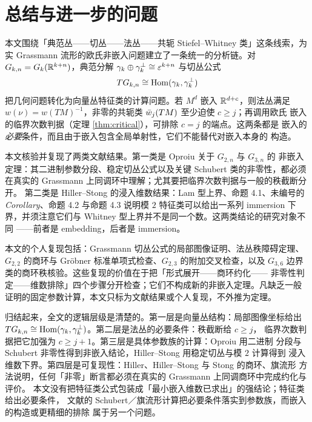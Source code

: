 \section{总结与进一步的问题}

本文围绕「典范丛——切丛——法丛——共轭 Stiefel--Whitney 类」这条线索，为实
Grassmann 流形的欧氏非嵌入问题建立了一条统一的分析链。对
$G_{k,n}=G_k(\mathbb{R}^{k+n})$，典范分解 $\gamma_k\oplus\gamma^{\perp}_k\cong\varepsilon^{k+n}$ 与切丛公式
\begin{equation*}
  TG_{k,n}\cong\operatorname{Hom}(\gamma_k,\gamma^{\perp}_k)
\end{equation*}
把几何问题转化为向量丛特征类的计算问题。若 $M^{d}$ 嵌入 $\mathbb{R}^{d+c}$，则法丛满足
$w(\nu)=w(TM)^{-1}$，非零的共轭类 $\bar w_j(TM)$ 至少迫使 $c\ge j$；再调用欧氏
嵌入的临界次数判据（定理 \ref{thm:critical}），可排除 $c=j$ 的端点。这两条都是
嵌入的\emph{必要}条件，而且由于嵌入包含全局单射性，它们不能替代对嵌入本身的
构造。

本文核验并复现了两类文献结果。第一类是 Oproiu 关于 $G_{2,n}$ 与 $G_{3,n}$ 的
非嵌入定理：其二进制参数分段、稳定切丛公式以及关键 Schubert 类的非零性，都必须
在真实的 Grassmann 上同调环中理解；尤其要把临界次数判据与一般的秩截断分开。
第二类是 Hiller--Stong 的浸入维数结果：Lam 型上界、命题 4.1、未编号的
\emph{Corollary}、命题 4.2 与命题 4.3 说明模 $2$ 特征类可以给出一系列 immersion
下界，并须注意它们与 Whitney 型上界并不是同一个数。这两类结论的研究对象不同
——前者是 embedding，后者是 immersion。

本文的个人复现包括：Grassmann 切丛公式的局部图像证明、法丛秩障碍定理、
$G_{2,2}$ 的商环与 Gr\"obner 标准单项式检查、$G_{2,3}$ 的附加交叉检查，以及
$G_{3,6}$ 边界类的商环秩核验。这些复现的价值在于把「形式展开——商环约化——
非零性判定——维数排除」四个步骤分开检查；它们不构成新的非嵌入定理。凡缺乏一般
证明的固定参数计算，本文只标为文献结果或个人复现，不外推为定理。

归结起来，全文的逻辑层级是清楚的。第一层是向量丛结构：局部图像坐标给出
$TG_{k,n}\cong\operatorname{Hom}(\gamma_k,\gamma^{\perp}_k)$。第二层是法丛的必要条件：秩截断给 $c\ge j$，
临界次数判据把它加强为 $c\ge j+1$。第三层是具体参数族的计算：Oproiu 用二进制
分段与 Schubert 非零性得到非嵌入结论，Hiller--Stong 用稳定切丛与模 $2$ 计算得到
浸入维数下界。第四层是可复现性：Hiller、Hiller--Stong 与 Stong 的商环、旗流形
方法说明，任何「非零」断言都必须在真实的 Grassmann 上同调商环中完成约化与评价。
本文没有把特征类公式包装成「最小嵌入维数已求出」的强结论；特征类给出必要条件，
文献的 Schubert／旗流形计算把必要条件落实到参数族，而嵌入的构造或更精细的排除
属于另一个问题。

